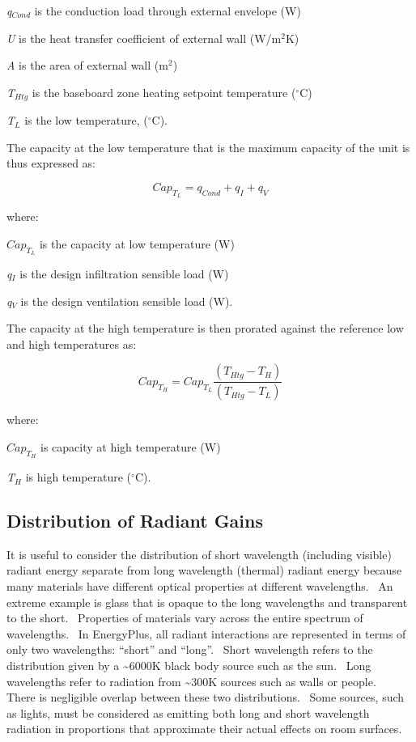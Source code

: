 \emph{q\(_{Cond}\)} is the conduction load through external envelope (W)

\emph{U} is the heat transfer coefficient of external wall (W/m\(^{2}\)K)

\emph{A} is the area of external wall (m\(^{2}\))

\emph{T\(_{Htg}\)} is the baseboard zone heating setpoint temperature (\(^{\circ}\)C)

\emph{T\(_{L}\)} is the low temperature, (\(^{\circ}\)C).

The capacity at the low temperature that is the maximum capacity of the unit is thus expressed as:

\begin{equation}
Ca{p_{{T_L}}} = {q_{Cond}} + {q_I} + {q_V}
\end{equation}

where:

\(Ca{p_{{T_L}}}\) is the capacity at low temperature (W)

\emph{q\(_{I}\)} is the design infiltration sensible load (W)

\emph{q\(_{V}\)} is the design ventilation sensible load (W).

The capacity at the high temperature is then prorated against the reference low and high temperatures as:

\begin{equation}
Ca{p_{{T_H}}} = Ca{p_{{T_L}}}\frac{{\left( {{T_{Htg}} - {T_H}} \right)}}{{\left( {{T_{Htg}} - {T_L}} \right)}}
\end{equation}

where:

\(Ca{p_{{T_H}}}\) is capacity at high temperature (W)

\emph{T\(_{H}\)} is high temperature (\(^{\circ}\)C).

\subsection{Distribution of Radiant Gains}\label{distribution-of-radiant-gains}

It is useful to consider the distribution of short wavelength (including visible) radiant energy separate from long wavelength (thermal) radiant energy because many materials have different optical properties at different wavelengths.~ An extreme example is glass that is opaque to the long wavelengths and transparent to the short.~ Properties of materials vary across the entire spectrum of wavelengths.~ In EnergyPlus, all radiant interactions are represented in terms of only two wavelengths: ``short'' and ``long''.~ Short wavelength refers to the distribution given by a \textasciitilde{}6000K black body source such as the sun.~ Long wavelengths refer to radiation from \textasciitilde{}300K sources such as walls or people.~ There is negligible overlap between these two distributions.~ Some sources, such as lights, must be considered as emitting both long and short wavelength radiation in proportions that approximate their actual effects on room surfaces.

